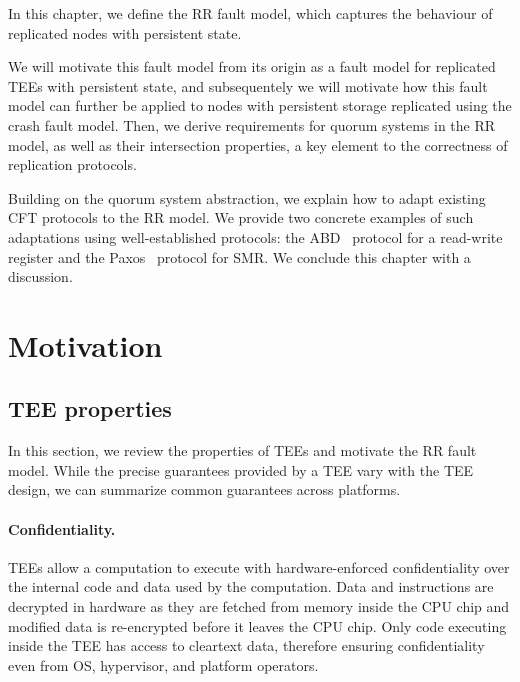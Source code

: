 \label{chap:model}
\cleardoublepage{}

In this chapter, we define the \ac{RR} fault model, which
captures the behaviour of replicated nodes with persistent state.

We will motivate this fault model from its origin as a fault model
for replicated \acp{TEE} with persistent state, and subsequentely
we will motivate how this fault model can further be applied to
nodes with persistent storage replicated using the crash fault
model. Then, we derive requirements for quorum systems in the
\ac{RR} model, as well as their intersection properties, a key element to the
correctness of replication protocols.

Building on the quorum system abstraction, we explain how to
adapt existing \ac{CFT} protocols to the \ac{RR} model. We
provide two concrete examples of such adaptations using
well-established protocols: the \ac{ABD}~\cite{abd} protocol for
a read-write register and the Paxos~\cite{paxos} protocol for
\ac{SMR}. We conclude this chapter with a discussion.

\section{Motivation}\label{sec:motivation}

\subsection{\ac{TEE} properties}\label{ssec:tee_motivation}

In this section, we review the properties of \acp{TEE} and motivate the
\ac{RR} fault model. While the precise guarantees provided by a
\ac{TEE} vary with the \ac{TEE} design, we can summarize common guarantees across platforms.

\paragraph{Confidentiality.} \acp{TEE} allow a computation to execute with
hardware-enforced confidentiality over the internal code and data used
by the computation. Data and instructions are decrypted in hardware as
they are fetched from memory inside the CPU chip and modified data is
re-encrypted before it leaves the CPU chip. Only code executing inside
the \ac{TEE} has access to cleartext data, therefore ensuring
confidentiality even from \ac{OS}, hypervisor, and platform
operators.

